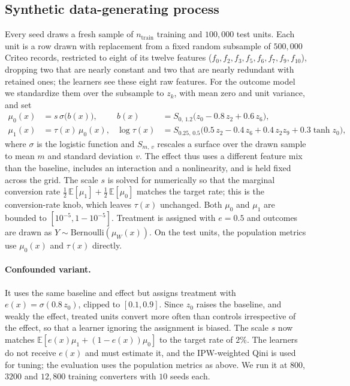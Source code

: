 \documentclass{article}
\begin{document}
\subsection{Synthetic data-generating process}
\label{app:dgp}
Every seed draws a fresh sample of $n_{\text{train}}$ training and
$100{,}000$ test units. Each
unit is a row drawn with replacement from a fixed random subsample of
$500{,}000$ Criteo records, restricted to eight of its twelve features
($f_0, f_2, f_3, f_5, f_6, f_7, f_9, f_{10}$), dropping two that are nearly
constant and two that are nearly redundant with retained ones; the learners see these eight
raw features. For the outcome model we standardize them over the subsample to
$z_k$, with mean zero and unit variance, and set
\begin{align*}
  \mu_0(x) &= s\,\sigma\bigl(b(x)\bigr), &
  b(x) &= S_{0,\,1.2}\bigl(z_0 - 0.8\,z_2 + 0.6\,z_6\bigr),\\
  \mu_1(x) &= \tau(x)\,\mu_0(x), &
  \log\tau(x) &= S_{0.25,\,0.5}\bigl(0.5\,z_2 - 0.4\,z_6 + 0.4\,z_2 z_9
                 + 0.3\tanh z_0\bigr),
\end{align*}
where $\sigma$ is the logistic function and $S_{m,\,v}$ rescales a surface
over the drawn sample to mean $m$ and standard deviation $v$. The effect
thus uses a different feature mix than the baseline, includes an interaction
and a nonlinearity, and is held fixed across the grid. The scale $s$ is solved
for numerically so that the marginal conversion rate
$\tfrac12\,\mathbb{E}[\mu_1] + \tfrac12\,\mathbb{E}[\mu_0]$ matches the target
rate; this is the conversion-rate knob, which leaves $\tau(x)$ unchanged.
Both $\mu_0$ and $\mu_1$ are bounded to $[10^{-5}, 1 - 10^{-5}]$. Treatment is
assigned with $e = 0.5$ and outcomes are drawn as
$Y \sim \mathrm{Bernoulli}(\mu_W(x))$. On the test units, the population metrics use $\mu_0(x)$ and $\tau(x)$ directly.
\paragraph{Confounded variant.} It uses the same baseline and effect but
assigns treatment with $e(x) = \sigma(0.8\, z_0)$, clipped to $[0.1, 0.9]$.
Since $z_0$ raises the baseline, and weakly the effect, treated units
convert more often than controls irrespective of the effect, so that a
learner ignoring the assignment is biased. The scale $s$ now matches
$\mathbb{E}[e(x)\mu_1 + (1-e(x))\mu_0]$ to the target rate of $2\%$. The
learners do not receive $e(x)$ and must estimate it, and the IPW-weighted
Qini is used for tuning; the evaluation uses the population metrics as
above. We run it at $800$, $3200$ and $12{,}800$ training converters with
$10$ seeds each.
\end{document}
